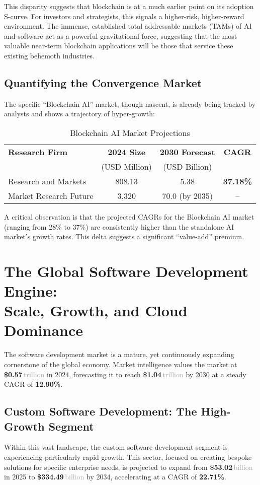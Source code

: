 \documentclass[11pt,a4paper]{report}
\newcommand{\marketvalue}[2]{\textcolor{trust}{\textbf{\$#1}}\,\textcolor{darkgray}{#2}}
\newcommand{\cagr}[1]{\textcolor{sun}{\textbf{#1\%}}}
\begin{document}
This disparity suggests that blockchain is at a much earlier point on its adoption S-curve. For investors and strategists, this signals a higher-risk, higher-reward environment. The immense, established total addressable markets (TAMs) of AI and software act as a powerful gravitational force, suggesting that the most valuable near-term blockchain applications will be those that service these existing behemoth industries.

\subsection{Quantifying the Convergence Market}

The specific ``Blockchain AI'' market, though nascent, is already being tracked by analysts and shows a trajectory of hyper-growth:

\begin{table}[H]
\centering
\caption{Blockchain AI Market Projections}
\begin{tabular}{lccc}
\toprule
\textbf{Research Firm} & \textbf{2024 Size} & \textbf{2030 Forecast} & \textbf{CAGR} \\
& (USD Million) & (USD Billion) & \\
\midrule
Research and Markets & 808.13 & 5.38 & \cagr{37.18} \\
Market Research Future & 3,320 & 70.0 (by 2035) & -- \\
\bottomrule
\end{tabular}
\end{table}

A critical observation is that the projected CAGRs for the Blockchain AI market (ranging from 28\% to 37\%) are consistently higher than the standalone AI market's growth rates. This delta suggests a significant ``value-add'' premium.

\clearpage
\section{The Global Software Development Engine:\\Scale, Growth, and Cloud Dominance}

The software development market is a mature, yet continuously expanding cornerstone of the global economy. Market intelligence values the market at \marketvalue{0.57}{trillion} in 2024, forecasting it to reach \marketvalue{1.04}{trillion} by 2030 at a steady CAGR of \cagr{12.90}.

\subsection{Custom Software Development: The High-Growth Segment}
Within this vast landscape, the custom software development segment is experiencing particularly rapid growth. This sector, focused on creating bespoke solutions for specific enterprise needs, is projected to expand from \marketvalue{53.02}{billion} in 2025 to \marketvalue{334.49}{billion} by 2034, accelerating at a CAGR of \cagr{22.71}.
\end{document}
